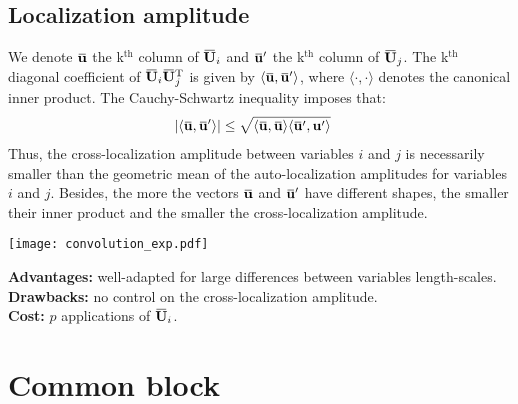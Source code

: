 \documentclass[12pt]{scrartcl}
\newcommand{\overbar}[1]{\mkern 1.5mu\overline{\mkern-1.5mu#1\mkern-1.5mu}\mkern 1.5mu}
\begin{document}
\subsection{Localization amplitude}
We denote $\overbar{\mathbf{u}}$ the k$^\textrm{th}$ column of $\overbar{\mathbf{U}}_i$ and $\overbar{\mathbf{u}}'$ the k$^\textrm{th}$ column of $\overbar{\mathbf{U}}_j$. The k$^\textrm{th}$ diagonal coefficient of $\overbar{\mathbf{U}}_i \overbar{\mathbf{U}}_j^\mathrm{T}$ is given by $\langle \overbar{\mathbf{u}},\overbar{\mathbf{u}}' \rangle$, where $\langle \cdot, \cdot \rangle$ denotes the canonical inner product. The Cauchy-Schwartz inequality imposes that:
\begin{align}
\vert \langle \overbar{\mathbf{u}},\overbar{\mathbf{u}}' \rangle \vert & \le \sqrt{\langle \overbar{\mathbf{u}},\overbar{\mathbf{u}} \rangle \langle \overbar{\mathbf{u}}',\mathbf{u}' \rangle}
\end{align}
Thus, the cross-localization amplitude between variables $i$ and $j$ is necessarily smaller than the geometric mean of the auto-localization amplitudes for variables $i$ and $j$. Besides, the more the vectors $\overbar{\mathbf{u}}$ and $\overbar{\mathbf{u}}'$ have different shapes, the smaller their inner product and the smaller the cross-localization amplitude.
\begin{center}
\texttt{[image: convolution\_exp.pdf]}
\end{center}
$  $\\
\textbf{Advantages:} well-adapted for large differences between variables length-scales.\\
\textbf{Drawbacks:} no control on the cross-localization amplitude.\\
\textbf{Cost:} $p$ applications of $\overbar{\mathbf{U}}_i$.

\section{Common block}
\end{document}

